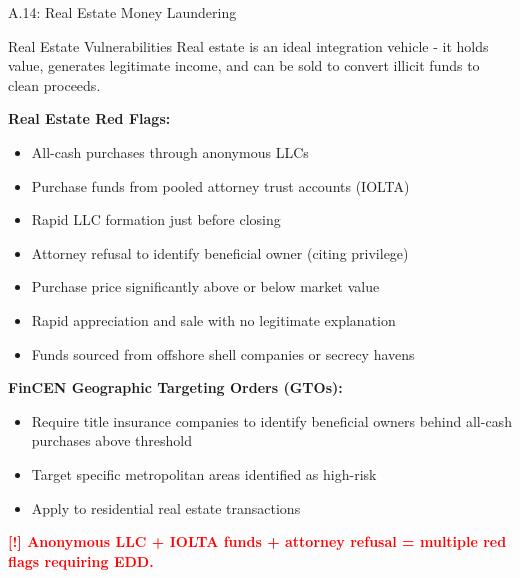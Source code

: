 \documentclass[11pt,a4paper]{beamer}
\newcommand{\redflag}[1]{\textcolor{red}{\textbf{[!] #1}}}
\begin{document}
	\begin{frame}{A.14: Real Estate Money Laundering}
		\begin{block}{Real Estate Vulnerabilities}
			Real estate is an ideal integration vehicle - it holds value, generates legitimate income, and can be sold to convert illicit funds to clean proceeds.
		\end{block}
		\textbf{Real Estate Red Flags:}
		\begin{itemize}
			\item All-cash purchases through anonymous LLCs
			\item Purchase funds from pooled attorney trust accounts (IOLTA)
			\item Rapid LLC formation just before closing
			\item Attorney refusal to identify beneficial owner (citing privilege)
			\item Purchase price significantly above or below market value
			\item Rapid appreciation and sale with no legitimate explanation
			\item Funds sourced from offshore shell companies or secrecy havens
		\end{itemize}
		\textbf{FinCEN Geographic Targeting Orders (GTOs):}
		\begin{itemize}
			\item Require title insurance companies to identify beneficial owners behind all-cash purchases above threshold
			\item Target specific metropolitan areas identified as high-risk
			\item Apply to residential real estate transactions
		\end{itemize}
		\redflag{Anonymous LLC + IOLTA funds + attorney refusal = multiple red flags requiring EDD.}
	\end{frame}
	
\end{document}

